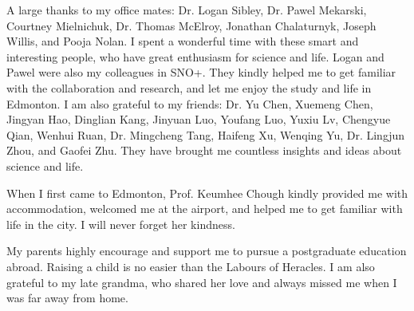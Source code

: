 A large thanks to my office mates: Dr. Logan Sibley, Dr. Pawel Mekarski, Courtney Mielnichuk, Dr. Thomas McElroy, Jonathan Chalaturnyk, Joseph Willis, and Pooja Nolan. I spent a wonderful time with these smart and interesting people, who have great enthusiasm for science and life. Logan and Pawel were also my colleagues in SNO+. They kindly helped me to get familiar with the collaboration and research, and let me enjoy the study and life in Edmonton. I am also grateful to my friends: Dr. Yu Chen, Xuemeng Chen, Jingyan Hao, Dinglian Kang, Jinyuan Luo, Youfang Luo, Yuxiu Lv, Chengyue Qian, Wenhui Ruan, Dr. Mingcheng Tang, Haifeng Xu, Wenqing Yu, Dr. Lingjun Zhou, and Gaofei Zhu. They have brought me countless insights and ideas about science and life.

When I first came to Edmonton, Prof. Keumhee Chough kindly provided me with accommodation, welcomed me at the airport, and helped me to get familiar with life in the city. I will never forget her kindness.

My parents highly encourage and support me to pursue a postgraduate education abroad. Raising a child is no easier than the Labours of Heracles. I am also grateful to my late grandma, who shared her love and always missed me when I was far away from home.
